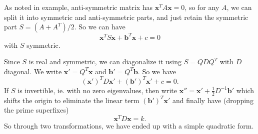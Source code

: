 \documentclass[a4paper]{article}
\begin{document}
      As noted in example, anti-symmetric matrix has $\mathbf{x}^TA\mathbf{x} = 0$, so for any $A$, we can split it into symmetric and anti-symmetric parts, and just retain the symmetric part $S = (A + A^T)/2$. So we can have
      \[
        \mathbf{x}^T S\mathbf{x} + \mathbf{b}^T\mathbf{x} + c = 0
      \]
      with $S$ symmetric.

      Since $S$ is real and symmetric, we can diagonalize it using $S = QDQ^T$ with $D$ diagonal. We write $\mathbf{x}' = Q^T \mathbf{x}$ and $\mathbf{b}' = Q^T \mathbf{b}$. So we have
      \[
        (\mathbf{x}')^TD\mathbf{x}' + (\mathbf{b}')^T \mathbf{x}' + c = 0.
      \]
      If $S$ is invertible, ie. with no zero eigenvalues, then write $\mathbf{x}'' = \mathbf{x}' + \frac{1}{2}D^{-1}\mathbf{b}'$ which shifts the origin to eliminate the linear term $(\mathbf{b}')^T\mathbf{x}'$ and finally have (dropping the prime superfixes)
      \[
        \mathbf{x}^TD\mathbf{x} = k.
      \]
      So through two transformations, we have ended up with a simple quadratic form.
\end{document}
